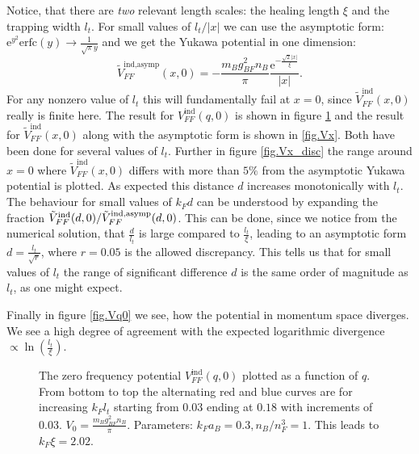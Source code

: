 Notice, that there are \textit{two} relevant length scales: the healing length $\xi$ and the trapping width $l_t$. For small values of $l_t/|x|$ we can use the asymptotic form: $\text{e}^{y^2}\text{erfc}(y) \to \frac{1}{\sqrt{\pi}y}$ and we get the Yukawa potential in one dimension:
\begin{equation}
\tilde{V}_{FF}^\text{ind,asymp}(x,0) = -\frac{m_Bg_{BF}^2n_B}{\pi}\frac{\text{e}^{-\frac{\sqrt{2}|x|}{\xi}}}{|x|}.
\label{eq.Vx_asymp}
\end{equation}
For any nonzero value of $l_t$ this will fundamentally fail at $x=0$, since $\tilde{V}_{FF}^\text{ind}(x,0)$ really is finite here. The result for $V_{FF}^\text{ind}(q,0)$ is shown in figure \ref{fig.Vq} and the result for $\tilde{V}_{FF}^\text{ind}(x,0)$ along with the asymptotic form is shown in \ref{fig.Vx}. Both have been done for several values of $l_t$. Further in figure \ref{fig.Vx_disc} the range around $x=0$ where $\tilde{V}_{FF}^\text{ind}(x,0)$ differs with more than $5\%$ from the asymptotic Yukawa potential is plotted. As expected this distance $d$ increases monotonically with $l_t$. The behaviour for small values of $k_F d$ can be understood by expanding the fraction $\tilde{V}_{FF}^\text{ind}(d,0)/\tilde{V}_{FF}^\text{ind,\text{asymp}}(d,0)$. This can be done, since we notice from the numerical solution, that $\frac{d}{l_t}$ is large compared to $\frac{l_t}{\xi}$, leading to an asymptotic form $d = \frac{l_t}{\sqrt{r}}$, where $r=0.05$ is the allowed discrepancy. This tells us that for small values of $l_t$ the range of significant difference $d$ is the same order of magnitude as $l_t$, as one might expect. 

Finally in figure \ref{fig.Vq0} we see, how the potential in momentum space diverges. We see a high degree of agreement with the expected logarithmic divergence $\propto \ln\left(\frac{l_t}{\xi}\right)$. 

\begin{figure} 
\begin{center}  
  
\caption{The zero frequency potential $V_{FF}^\text{ind}(q,0)$ plotted as a function of $q$. From bottom to top the alternating red and blue curves are for increasing $k_F l_t$ starting from $0.03$ ending at $0.18$ with increments of $0.03$. $V_0 = \frac{m_Bg_{BF}^2n_B}{\pi}$. Parameters: $k_F a_B = 0.3, n_B/n_F^3 = 1$. This leads to $k_F\xi = 2.02$.}  
\label{fig.Vq}  
\end{center}    
\end{figure}

